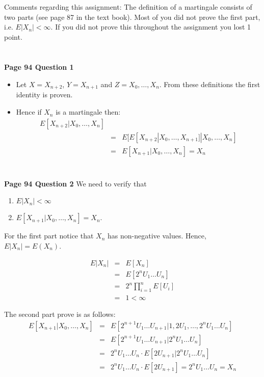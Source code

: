 \documentclass[10pt,a4paper]{article}
\begin{document}
\begin{flushleft}
Comments regarding this assignment: The definition of a martingale
consists of two parts (see page 87 in the text book). Most of you
did not prove the first part, i.e. $E|X_n|<\infty$. If you did not
prove this throughout the assignment you lost 1 point.



\begin{eqnarray*}
\\
\end{eqnarray*}

\textbf{Page 94 Question 1}
\begin{itemize}
    \item Let $X=X_{n+2}$, $Y=X_{n+1}$ and $Z={X_0,\ldots,X_n}$.
    From these definitions the first identity is proven.
    \item Hence if $X_n$ is a martingale then:
    \begin{eqnarray*}
    E[X_{n+2}|X_0,\ldots,X_n]\\
    &=&E[E[X_{n+2}|X_0,\ldots,X_{n+1}]|X_0,\ldots,X_n]\\
    &=&E[X_{n+1}|X_0,\ldots,X_n]= X_n
    \end{eqnarray*}

    \end{itemize}



\begin{eqnarray*}
\\
\end{eqnarray*}

\textbf{Page 94 Question 2} We need to verify that
\begin{enumerate}
    \item $E|X_n|<\infty$
    \item $E[X_{n+1}|X_0,\ldots,X_n]=X_n$.

\end{enumerate}
For the first part notice that $X_n$ has non-negative values.
Hence, $E|X_n|=E(X_n)$.

\begin{eqnarray*}
E|X_n|&=&E[X_n]\\
&=& E[2^{n}U_1\ldots U_{n}]\\
&=& 2^n \prod_{i=1}^n E[U_i]\\
&=& 1<\infty
\end{eqnarray*}

The second part prove is as follows:
\begin{eqnarray*}
E[X_{n+1}|X_0,\ldots,X_n]&=& E[2^{n+1}U_1\ldots
U_{n+1}|1,2U_1,\ldots,2^n U_1 \ldots U_n]\\
&=& E[2^{n+1}U_1\ldots
U_{n+1}|2^n U_1 \ldots U_n]\\
&=& 2^{n}U_1 \ldots U_n \cdot E[2U_{n+1}|2^n U_1 \ldots U_n]\\
&=& 2^{n} U_1 \ldots U_n \cdot E[2U_{n+1}] = 2^n U_1 \ldots U_n =
X_n
\end{eqnarray*}




\end{flushleft}
\end{document}
